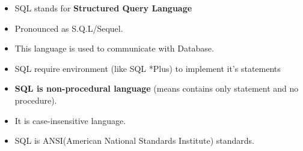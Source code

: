 \begin{flushleft}
	
	\begin{itemize}
		\item SQL stands for \textbf{Structured Query Language}
		\item Pronounced as S.Q.L/Sequel.
		\item This language is used to communicate with Database.
		\item SQL require environment (like SQL *Plus) to implement it's statements
		\item \textbf{SQL is non-procedural language} (means contains only statement and no procedure).
		\item It is case-insensitive language.
		\item SQL is ANSI(American National Standards Institute) standards.
	\end{itemize}
	
\end{flushleft}
